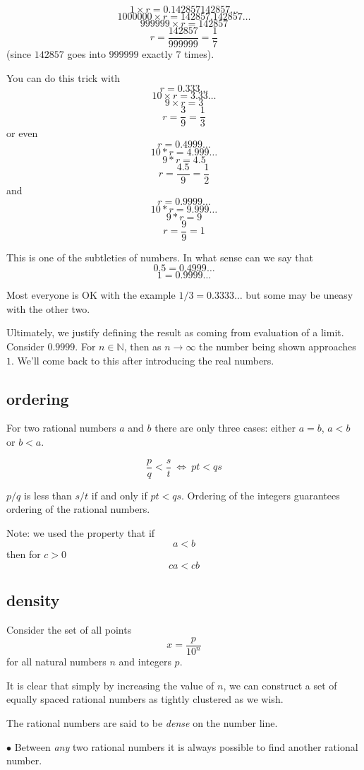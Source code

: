 \documentclass[11pt, oneside]{article}
\begin{document}
\[ 1 \times r = 0.142857142857 \dots \]
\[ 1000000 \times r = 142857.142857 \dots \]
\[ 999999 \times r = 142857 \]
\[ r = \frac{142857}{999999} = \frac{1}{7} \]
(since $142857$ goes into $999999$ exactly $7$ times).  

You can do this trick with 
\[ r = 0.333 \dots \]
\[ 10 \times r = 3.33 \dots \]
\[ 9 \times r = 3 \]
\[ r = \frac{3}{9} = \frac{1}{3} \]
or even
\[ r = 0.4999 \dots \]
\[ 10*r = 4.999 \dots \]
\[ 9*r = 4.5 \]
\[ r = \frac{4.5}{9} = \frac{1}{2} \]
and
\[ r = 0.9999 \dots \]
\[ 10*r = 9.999 \dots \]
\[ 9*r = 9 \]
\[ r = \frac{9}{9} = 1 \]

This is one of the subtleties of numbers.  In what sense can we say that 
\[ 0.5 = 0.4999 \dots \]
\[ 1 = 0.9999 \dots \]

Most everyone is OK with the example $1/3 = 0.3333 \dots$ but some may be uneasy with the other two.

Ultimately, we justify defining the result as coming from evaluation of a limit.  Consider $0.9999$.  For $n \in \mathbb{N}$, then as $n \rightarrow \infty$ the number being shown approaches $1$.  We'll come back to this after introducing the real numbers.

\subsection*{ordering}
For two rational numbers $a$ and $b$ there are only three cases:  either $a=b$, $a < b$ or $b < a$.

\[ \frac{p}{q} < \frac{s}{t} \ \iff \ pt < qs \]

$p/q$ is less than $s/t$ if and only if $pt < qs$.  Ordering of the integers guarantees ordering of the rational numbers.

Note:  we used the property that if
\[ a < b \]
then for $c > 0$
\[ ca < cb \]

\subsection*{density}
Consider the set of all points
\[ x = \frac{p}{10^n} \]
for all natural numbers $n$ and integers $p$.

It is clear that simply by increasing the value of $n$, we can construct a set of equally spaced rational numbers as tightly clustered as we wish.

The rational numbers are said to be \emph{dense} on the number line.  

$\bullet$  Between \emph{any} two rational numbers it is always possible to find another rational number.  
\end{document}
